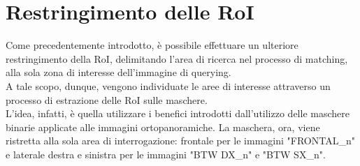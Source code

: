 \documentclass[12pt,a4paper,openright,twoside]{book}
\begin{document}
\chapter{Restringimento delle RoI}
Come precedentemente introdotto, è possibile effettuare un ulteriore restringimento della RoI, delimitando l'area di ricerca nel processo di matching, alla sola zona di interesse dell'immagine di querying.\\
A tale scopo, dunque, vengono individuate le aree di interesse attraverso un processo di estrazione delle RoI sulle maschere.\\
L'idea, infatti, è quella utilizzare i benefici introdotti dall'utilizzo delle maschere binarie applicate alle immagini ortopanoramiche. La maschera, ora, viene ristretta alla sola area di interrogazione: frontale per le immagini "FRONTAL\_n" e laterale destra e sinistra per le immagini "BTW DX\_n" e "BTW SX\_n".\\
\end{document}

